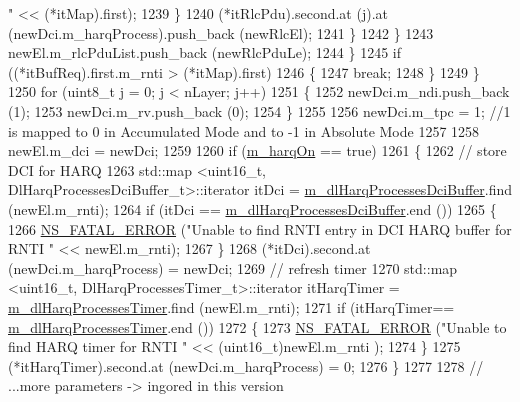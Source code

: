 \begin{DoxyCode}
{      "} << (*itMap).first);
1239                         \}
1240                       (*itRlcPdu).second.at (j).at (newDci.m\_harqProcess).push\_back (newRlcEl);
1241                     \}
1242                 \}
1243               newEl.m\_rlcPduList.push\_back (newRlcPduLe);
1244             \}
1245           \textcolor{keywordflow}{if} ((*itBufReq).first.m\_rnti > (*itMap).first)
1246             \{
1247               \textcolor{keywordflow}{break};
1248             \}
1249         \}
1250       \textcolor{keywordflow}{for} (uint8\_t j = 0; j < nLayer; j++)
1251         \{
1252           newDci.m\_ndi.push\_back (1);
1253           newDci.m\_rv.push\_back (0);
1254         \}
1255 
1256       newDci.m\_tpc = 1; \textcolor{comment}{//1 is mapped to 0 in Accumulated Mode and to -1 in Absolute Mode}
1257 
1258       newEl.m\_dci = newDci;
1259 
1260       \textcolor{keywordflow}{if} (\hyperlink{classns3_1_1FdBetFfMacScheduler_a37792b61da166e932f6697569d19a479}{m\_harqOn} == \textcolor{keyword}{true})
1261         \{
1262           \textcolor{comment}{// store DCI for HARQ}
1263           std::map <uint16\_t, DlHarqProcessesDciBuffer\_t>::iterator itDci = 
      \hyperlink{classns3_1_1FdBetFfMacScheduler_af37ecddc35da4f5a44cc0c50b08a4a96}{m\_dlHarqProcessesDciBuffer}.find (newEl.m\_rnti);
1264           \textcolor{keywordflow}{if} (itDci == \hyperlink{classns3_1_1FdBetFfMacScheduler_af37ecddc35da4f5a44cc0c50b08a4a96}{m\_dlHarqProcessesDciBuffer}.end ())
1265             \{
1266               \hyperlink{group__fatal_ga5131d5e3f75d7d4cbfd706ac456fdc85}{NS\_FATAL\_ERROR} (\textcolor{stringliteral}{"Unable to find RNTI entry in DCI HARQ buffer for RNTI "} << 
      newEl.m\_rnti);
1267             \}
1268           (*itDci).second.at (newDci.m\_harqProcess) = newDci;
1269           \textcolor{comment}{// refresh timer}
1270           std::map <uint16\_t, DlHarqProcessesTimer\_t>::iterator itHarqTimer =  
      \hyperlink{classns3_1_1FdBetFfMacScheduler_a78314b001be9986429ecb13daac0885a}{m\_dlHarqProcessesTimer}.find (newEl.m\_rnti);
1271           \textcolor{keywordflow}{if} (itHarqTimer== \hyperlink{classns3_1_1FdBetFfMacScheduler_a78314b001be9986429ecb13daac0885a}{m\_dlHarqProcessesTimer}.end ())
1272             \{
1273               \hyperlink{group__fatal_ga5131d5e3f75d7d4cbfd706ac456fdc85}{NS\_FATAL\_ERROR} (\textcolor{stringliteral}{"Unable to find HARQ timer for RNTI "} << (uint16\_t)newEl.m\_rnti
      );
1274             \}
1275           (*itHarqTimer).second.at (newDci.m\_harqProcess) = 0;
1276         \}
1277 
1278       \textcolor{comment}{// ...more parameters -> ingored in this version}

\end{DoxyCode}
